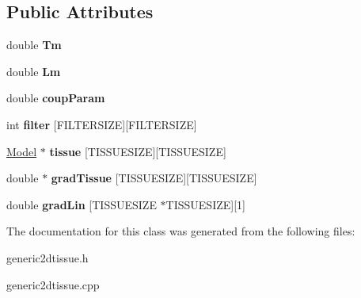 \subsection*{Public Attributes}
\begin{DoxyCompactItemize}
\item 
double {\bfseries Tm}\hypertarget{classGeneric2DTissue_a3184ed502dd8122f0654ab6ce85a1ed2}{}\label{classGeneric2DTissue_a3184ed502dd8122f0654ab6ce85a1ed2}

\item 
double {\bfseries Lm}\hypertarget{classGeneric2DTissue_a00b5a2ea65b4479c2f35784e9c4d203a}{}\label{classGeneric2DTissue_a00b5a2ea65b4479c2f35784e9c4d203a}

\item 
double {\bfseries coup\+Param}\hypertarget{classGeneric2DTissue_ac7d8a50c2dd16f4e7e814cba468c1917}{}\label{classGeneric2DTissue_ac7d8a50c2dd16f4e7e814cba468c1917}

\item 
int {\bfseries filter} \mbox{[}F\+I\+L\+T\+E\+R\+S\+I\+ZE\mbox{]}\mbox{[}F\+I\+L\+T\+E\+R\+S\+I\+ZE\mbox{]}\hypertarget{classGeneric2DTissue_a165f041537d08e14c8fdf200e0e4b430}{}\label{classGeneric2DTissue_a165f041537d08e14c8fdf200e0e4b430}

\item 
\hyperlink{classModel}{Model} $\ast$ {\bfseries tissue} \mbox{[}T\+I\+S\+S\+U\+E\+S\+I\+ZE\mbox{]}\mbox{[}T\+I\+S\+S\+U\+E\+S\+I\+ZE\mbox{]}\hypertarget{classGeneric2DTissue_af4fd698225333a7abc32fceab9ad1e68}{}\label{classGeneric2DTissue_af4fd698225333a7abc32fceab9ad1e68}

\item 
double $\ast$ {\bfseries grad\+Tissue} \mbox{[}T\+I\+S\+S\+U\+E\+S\+I\+ZE\mbox{]}\mbox{[}T\+I\+S\+S\+U\+E\+S\+I\+ZE\mbox{]}\hypertarget{classGeneric2DTissue_ac0b567eca767705c7028301fcfe30882}{}\label{classGeneric2DTissue_ac0b567eca767705c7028301fcfe30882}

\item 
double {\bfseries grad\+Lin} \mbox{[}T\+I\+S\+S\+U\+E\+S\+I\+ZE $\ast$T\+I\+S\+S\+U\+E\+S\+I\+ZE\mbox{]}\mbox{[}1\mbox{]}\hypertarget{classGeneric2DTissue_a84d9d1627e3299a37a582d8b156db323}{}\label{classGeneric2DTissue_a84d9d1627e3299a37a582d8b156db323}

\end{DoxyCompactItemize}


The documentation for this class was generated from the following files\+:\begin{DoxyCompactItemize}
\item 
generic2dtissue.\+h\item 
generic2dtissue.\+cpp\end{DoxyCompactItemize}
